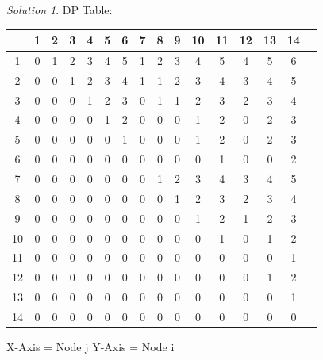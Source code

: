\documentclass[12pt]{article}
\theoremstyle{remark}
\newtheorem*{solution}{Solution}
\begin{document}
\begin{enumerate}
        \begin{solution} DP Table: \\
\begin{center}
\begin{tabular}{ |c|c|c|c|c|c|c|c|c|c|c|c|c|c|c|c| } 
 \hline
& 1 & 2 & 3 & 4 & 5 & 6 & 7 & 8 & 9 & 10 & 11 & 12 & 13 & 14 \\
\hline
1 & 0 & 1 & 2 & 3 & 4 & 5 & 1 & 2 & 3 & 4 & 5 & 4 & 5 & 6 \\
 \hline
2 & 0 & 0 & 1 & 2 & 3 & 4 & 1 & 1 & 2 & 3 & 4 & 3 & 4 & 5 \\
 \hline
3 & 0 & 0 & 0 & 1 & 2 & 3 & 0 & 1 & 1 & 2 & 3 & 2 & 3 & 4 \\
 \hline
4 & 0 & 0 & 0 & 0 & 1 & 2 & 0 & 0 & 0 & 1 & 2 & 0 & 2 & 3 \\
 \hline
5 & 0 & 0 & 0 & 0 & 0 & 1 & 0 & 0 & 0 & 1 & 2 & 0 & 2 & 3 \\
 \hline
6 & 0 & 0 & 0 & 0 & 0 & 0 & 0 & 0 & 0 & 0 & 1 & 0 & 0 & 2 \\
 \hline
7 & 0 & 0 & 0 & 0 & 0 & 0 & 0 & 1 & 2 & 3 & 4 & 3 & 4 & 5 \\
 \hline
8 & 0 & 0 & 0 & 0 & 0 & 0 & 0 & 0 & 1 & 2 & 3 & 2 & 3 & 4 \\
 \hline
9 & 0 & 0 & 0 & 0 & 0 & 0 & 0 & 0 & 0 & 1 & 2 & 1 & 2 & 3 \\
 \hline
10 & 0 & 0 & 0 & 0 & 0 & 0 & 0 & 0 & 0 & 0 & 1 & 0 & 1 & 2 \\
 \hline
11 & 0 & 0 & 0 & 0 & 0 & 0 & 0 & 0 & 0 & 0 & 0 & 0 & 0 & 1 \\
 \hline
12 & 0 & 0 & 0 & 0 & 0 & 0 & 0 & 0 & 0 & 0 & 0 & 0 & 1 & 2 \\
 \hline
13 & 0 & 0 & 0 & 0 & 0 & 0 & 0 & 0 & 0 & 0 & 0 & 0 & 0 & 1 \\
 \hline
14 & 0 & 0 & 0 & 0 & 0 & 0 & 0 & 0 & 0 & 0 & 0 & 0 & 0 & 0 \\
 \hline
\end{tabular}
\end{center}
X-Axis = Node j
Y-Axis = Node i
        \end{solution}


\end{enumerate}
\end{document}
